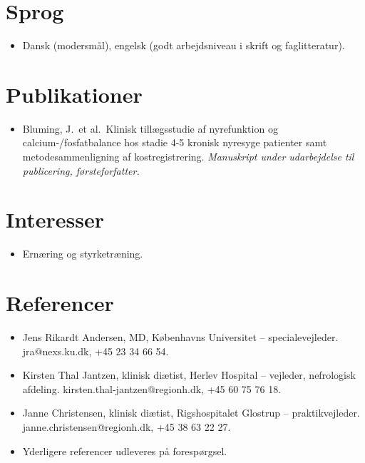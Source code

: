 \documentclass[11pt,a4paper,sans]{moderncv}
\begin{document}

\section{Sprog}
\vspace{1pt}
\begin{itemize}
\item {Dansk (modersmål), engelsk (godt arbejdsniveau i skrift og faglitteratur).}
\end{itemize}


\section{Publikationer}
\vspace{1pt}
\begin{itemize}
\item {Bluming, J.\ et al.\ Klinisk tillægsstudie af nyrefunktion og calcium-/fosfatbalance hos stadie 4-5 kronisk nyresyge patienter samt metodesammenligning af kostregistrering. \emph{Manuskript under udarbejdelse til publicering, førsteforfatter.}}
\end{itemize}


\section{Interesser}
\vspace{1pt}
\begin{itemize}
\item {Ernæring og styrketræning.}
\end{itemize}


\section{Referencer}
\vspace{1pt}
\begin{itemize}
\item {Jens Rikardt Andersen, MD, Københavns Universitet -- specialevejleder. jra@nexs.ku.dk, +45 23 34 66 54.}
\item {Kirsten Thal Jantzen, klinisk diætist, Herlev Hospital -- vejleder, nefrologisk afdeling. kirsten.thal-jantzen@regionh.dk, +45 60 75 76 18.}
\item {Janne Christensen, klinisk diætist, Rigshospitalet Glostrup -- praktikvejleder. janne.christensen@regionh.dk, +45 38 63 22 27.}
\item {Yderligere referencer udleveres på forespørgsel.}
\end{itemize}
\end{document}
